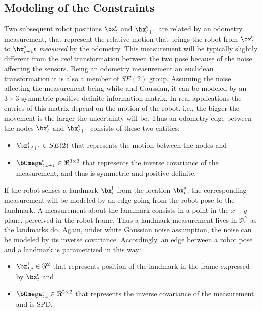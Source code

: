 \documentclass[a4paper]{article}
\begin{document}
\subsection{Modeling of the Constraints}
Two subsequent robot positions $\bx^\mathrm{s}_t$ and
$\bx^\mathrm{s}_{t+1}$ are related by an odometry measurement, that
represent the relative motion that brings the robot from
$\bx^\mathrm{s}_t$ to $\bx^\mathrm{s}_{t+1}t$ \emph{measured} by the
odometry. This measurement will be typically slightly different from
the \emph{real} transformation between the two pose because of the
noise affecting the sensors.  Being an odometry measurement an
euclidean transformation it is also a member of $SE(2)$ group.
Assuming the noise affecting the measurement being white and Gaussian,
it can be modeled by an $3 \times 3$ symmetric positive definite
information matrix.  In real applications the entries of this matrix
depend on the motion of the robot.  i.e., the bigger the movement is
the larger the uncertainty will be.
Thus an odometry edge between the nodes $\bx^\mathrm{s}_t$ and
$\bx^\mathrm{s}_{t+1}$ consists of these two entities:
\begin{itemize}
\item $\bz^\mathrm{s}_{t,t+1} \in SE(2)$ that represents the motion
  between the nodes and
\item $\bOmega^\mathrm{s}_{t,t+1} \in \Re^{3 \times 3}$ that represents the
  inverse covariance of the measurement, and thus is symmetric and
  positive definite.
\end{itemize}

If the robot senses a landmark $\bx^\mathrm{l}_i$ from the location
$\bx^\mathrm{s}_t$, the corresponding measurement will be modeled by
an edge going from the robot pose to the landmark. A measurement about
the landmark consists in a point in the $x-y$ plane, perceived in the
robot frame. Thus a landmark measurement lives in $\Re^2$ as the
landmarks do. Again, under white Gaussian noise assumption, the
noise can be modeled by its inverse covariance. Accordingly, an edge between
a robot pose and a landmark is parametrized in this way:
\begin{itemize}
\item $\bz^\mathrm{l}_{t,i} \in \Re^2$ that represents position of the landmark
  in the frame expressed by $\bx^\mathrm{s}_t$ and
\item $\bOmega^\mathrm{l}_{t,i} \in \Re^{2 \times 2}$ that represents the inverse
  covariance of the measurement and is SPD.
\end{itemize}
\end{document}

